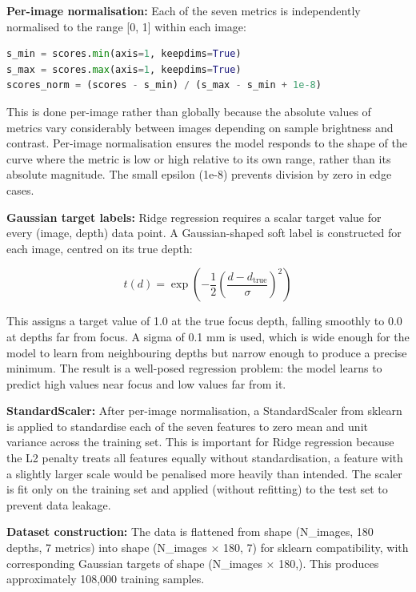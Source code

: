 \documentclass{article}
\begin{document}
\textbf{Per-image normalisation:} Each of the seven metrics is independently normalised to the range [0, 1] within each image:

\begin{lstlisting}[language=Python, caption={Snippet of code from $ridge\_regression.py$ \cite{Ridge}}, basicstyle=\ttfamily\small, frame=single, breaklines=true]
s_min = scores.min(axis=1, keepdims=True) 
s_max = scores.max(axis=1, keepdims=True)  
scores_norm = (scores - s_min) / (s_max - s_min + 1e-8)
\end{lstlisting}

This is done per-image rather than globally because the absolute values of metrics vary considerably between images depending on sample brightness and contrast. Per-image normalisation ensures the model responds to the shape of the curve where the metric is low or high relative to its own range, rather than its absolute magnitude. The small epsilon (1e-8) prevents division by zero in edge cases.

\textbf{Gaussian target labels:} Ridge regression requires a scalar target value for every (image, depth) data point. A Gaussian-shaped soft label is constructed for each image, centred on its true depth: \cite{Ridge}

\begin{equation}
    t(d) = \exp\!\left(-\frac{1}{2}\left(\frac{d - d_{\text{true}}}{\sigma}\right)^2\right)
\end{equation}

This assigns a target value of 1.0 at the true focus depth, falling smoothly to 0.0 at depths far from focus. A sigma of 0.1 mm is used, which is wide enough for the model to learn from neighbouring depths but narrow enough to produce a precise minimum. The result is a well-posed regression problem: the model learns to predict high values near focus and low values far from it.

\textbf{StandardScaler:} After per-image normalisation, a StandardScaler from sklearn is applied to standardise each of the seven features to zero mean and unit variance across the training set. This is important for Ridge regression because the L2 penalty treats all features equally without standardisation, a feature with a slightly larger scale would be penalised more heavily than intended. The scaler is fit only on the training set and applied (without refitting) to the test set to prevent data leakage. \cite{Scikit_Standard}

\textbf{Dataset construction:} The data is flattened from shape (N\_images, 180 depths, 7 metrics) into shape (N\_images × 180, 7) for sklearn compatibility, with corresponding Gaussian targets of shape (N\_images × 180,). This produces approximately 108,000 training samples.
\end{document}
